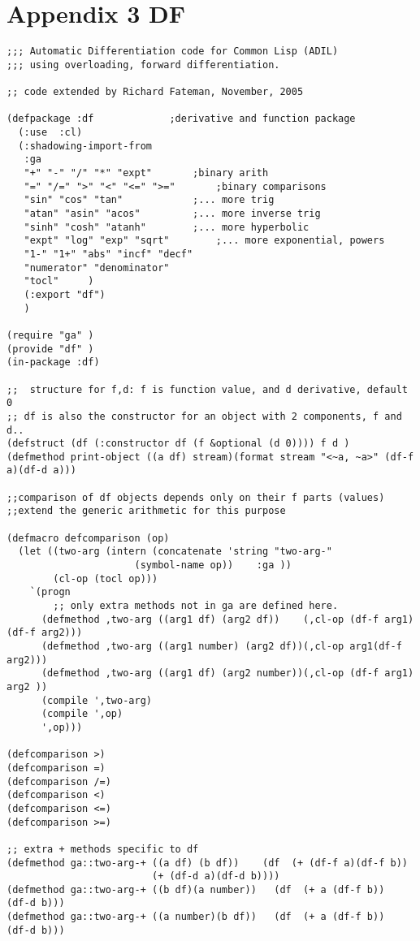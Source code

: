 \documentclass{article}
\begin{document}
{{{{\section*{Appendix 3 DF}
\begin{verbatim}
;;; Automatic Differentiation code for Common Lisp (ADIL)
;;; using overloading, forward differentiation.

;; code extended by Richard Fateman, November, 2005

(defpackage :df				;derivative and function package
  (:use  :cl)
  (:shadowing-import-from 
   :ga
   "+" "-" "/" "*" "expt"		;binary arith
   "=" "/=" ">" "<" "<=" ">="		;binary comparisons
   "sin" "cos" "tan"			;... more trig
   "atan" "asin" "acos"			;... more inverse trig
   "sinh" "cosh" "atanh"		;... more hyperbolic
   "expt" "log" "exp" "sqrt"		;... more exponential, powers
   "1-" "1+" "abs" "incf" "decf"
   "numerator" "denominator"	  
   "tocl" 	  )
   (:export "df")
   )
  
(require "ga" )
(provide "df" )
(in-package :df)

;;  structure for f,d: f is function value, and d derivative, default 0
;; df is also the constructor for an object with 2 components, f and d..
(defstruct (df (:constructor df (f &optional (d 0)))) f d )
(defmethod print-object ((a df) stream)(format stream "<~a, ~a>" (df-f a)(df-d a)))

;;comparison of df objects depends only on their f parts (values)
;;extend the generic arithmetic for this purpose

(defmacro defcomparison (op)
  (let ((two-arg (intern (concatenate 'string "two-arg-" 
				      (symbol-name op))    :ga ))
        (cl-op (tocl op)))
    `(progn
        ;; only extra methods not in ga are defined here.
      (defmethod ,two-arg ((arg1 df) (arg2 df))    (,cl-op (df-f arg1)(df-f arg2)))
      (defmethod ,two-arg ((arg1 number) (arg2 df))(,cl-op arg1(df-f arg2)))
      (defmethod ,two-arg ((arg1 df) (arg2 number))(,cl-op (df-f arg1) arg2 ))
      (compile ',two-arg)
      (compile ',op)
      ',op)))

(defcomparison >)
(defcomparison =)
(defcomparison /=)
(defcomparison <)
(defcomparison <=)
(defcomparison >=)

;; extra + methods specific to df
(defmethod ga::two-arg-+ ((a df) (b df))    (df  (+ (df-f a)(df-f b))
						 (+ (df-d a)(df-d b))))
(defmethod ga::two-arg-+ ((b df)(a number))   (df  (+ a (df-f b))    (df-d b)))
(defmethod ga::two-arg-+ ((a number)(b df))   (df  (+ a (df-f b))    (df-d b)))


\end{verbatim}}}}}
\end{document}
